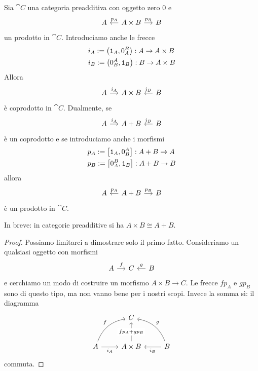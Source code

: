 \begin{proposition}\label{proposition:BinProdsAreBinCoprods}
  Sia \(\cat C\) una categoria preadditiva con oggetto zero \(0\) e
  \[
    \begin{tikzcd}[column sep=small]
      A & A \times B \ar["{p_A}", l, swap] \ar["{p_B}", r] & B
    \end{tikzcd}
  \]
  un prodotto in \(\cat C\).  Introduciamo anche le frecce
  \begin{equation}
    \label{eq:InjViaProj}
    \begin{aligned}
      & i_A := \left( \mathtt 1_A, 0_A^B \right) : A \to A \times B \\
      & i_B := \left( 0_B^A, \mathtt 1_B \right) : B \to A \times B
    \end{aligned}
  \end{equation}
  Allora
  \[
    \begin{tikzcd}[column sep=small]
      A \ar["{i_A}", r] & A \times B & B \ar["{i_B}", l, swap]
    \end{tikzcd}
  \]
  è coprodotto in \(\cat C\). Dualmente, se
  \[
    \begin{tikzcd}[column sep=small]
      A \ar["{i_A}", r] & A + B & B \ar["{i_B}", l, swap]
    \end{tikzcd}
  \]
  è un coprodotto e se introduciamo anche i morfismi
  \begin{equation}
    \label{eq:ProjViaInj}
    \begin{aligned}
      & p_A := \left[ \mathtt 1_A, 0_B^A \right] : A + B \to A \\
      & p_B := \left[ 0_A^B, \mathtt 1_B \right] : A + B \to B
    \end{aligned}
  \end{equation}
  allora
  \[
    \begin{tikzcd}[column sep=small]
      A & A + B \ar["{p_A}", l, swap] \ar["{p_B}", r] & B
    \end{tikzcd}
  \]
  è un prodotto in \(\cat C\).
\end{proposition}

In breve: in categorie preadditive si ha \(A \times B \cong A+B\).

\begin{proof}
  Possiamo limitarci a dimostrare solo il primo fatto. Consideriamo un
  qualsiasi oggetto con morfismi
  \[
    \begin{tikzcd}[column sep=small]
      A \ar["f", r] & C & B \ar["g", l, swap]
    \end{tikzcd}
  \]
  e cerchiamo un modo di costruire un morfismo \(A \times B \to C\). Le
  frecce \(f p_A\) e \(g p_B\) sono di questo tipo, ma non vanno bene
  per i nostri scopi. Invece la somma sì: il diagramma
  \[
    \begin{tikzcd}[row sep=large]
      & C \\
      A \ar["{i_A}", r, swap] \ar["f", ur, bend left] & A \times B
      \ar["{f p_A + g p_B}" description, u] & B \ar["{i_B}", l] \ar["g",
      ul, bend right, swap]
    \end{tikzcd}
  \]
  commuta.
\end{proof}

